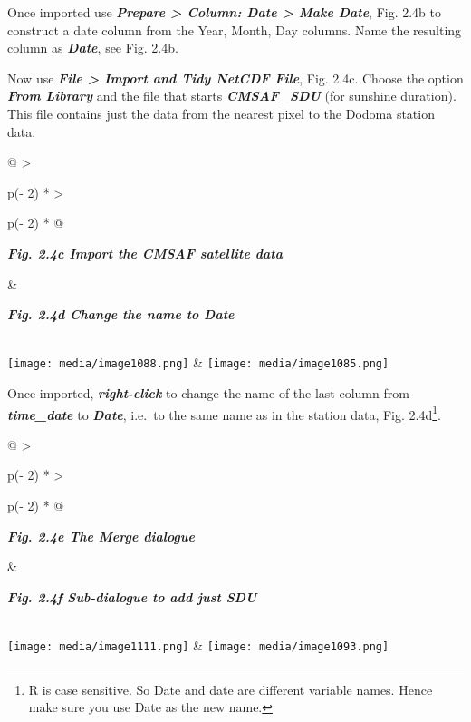 \documentclass[
  letterpaper,
  DIV=11,
  numbers=noendperiod]{scrreprt}
\begin{document}
Once imported use \textbf{\emph{Prepare \textgreater{} Column: Date
\textgreater{} Make Date}}, Fig. 2.4b to construct a date column from
the Year, Month, Day columns. Name the resulting column as
\textbf{\emph{Date}}, see Fig. 2.4b.

Now use \textbf{\emph{File \textgreater{} Import and Tidy NetCDF File}},
Fig. 2.4c. Choose the option \textbf{\emph{From Library}} and the file
that starts \textbf{\emph{CMSAF\_SDU}} (for sunshine duration). This
file contains just the data from the nearest pixel to the Dodoma station
data.

\begin{longtable}[]{@{}
  >{\raggedright\arraybackslash}p{(\columnwidth - 2\tabcolsep) * }
  >{\raggedright\arraybackslash}p{(\columnwidth - 2\tabcolsep) * }@{}}
\toprule\noalign{}
\begin{minipage}[b]{\linewidth}\raggedright
\textbf{\emph{Fig. 2.4c Import the CMSAF satellite data}}
\end{minipage} & \begin{minipage}[b]{\linewidth}\raggedright
\textbf{\emph{Fig. 2.4d Change the name to Date}}
\end{minipage} \\
\midrule\noalign{}
\endhead
\bottomrule\noalign{}
\endlastfoot
\texttt{[image: media/image1088.png]}
&
\texttt{[image: media/image1085.png]} \\
\end{longtable}

Once imported, \textbf{\emph{right-click}} to change the name of the
last column from \textbf{\emph{time\_date}} to \textbf{\emph{Date}},
i.e.~to the same name as in the station data, Fig. 2.4d\footnote{R is
  case sensitive. So Date and date are different variable names. Hence
  make sure you use Date as the new name.}.

\begin{longtable}[]{@{}
  >{\raggedright\arraybackslash}p{(\columnwidth - 2\tabcolsep) * }
  >{\raggedright\arraybackslash}p{(\columnwidth - 2\tabcolsep) * }@{}}
\toprule\noalign{}
\begin{minipage}[b]{\linewidth}\raggedright
\textbf{\emph{Fig. 2.4e The Merge dialogue}}
\end{minipage} & \begin{minipage}[b]{\linewidth}\raggedright
\textbf{\emph{Fig. 2.4f Sub-dialogue to add just SDU}}
\end{minipage} \\
\midrule\noalign{}
\endhead
\bottomrule\noalign{}
\endlastfoot
\texttt{[image: media/image1111.png]}
&
\texttt{[image: media/image1093.png]} \\
\end{longtable}
\end{document}
